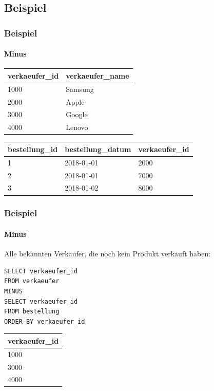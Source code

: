 \documentclass[10pt,a4paper]{beamer}
\begin{document}
\subsection{Beispiel}
\begin{frame}[fragile]
\frametitle{Beispiel}
\framesubtitle{Minus}
\begin{tabular}{l|l}
\textbf{verkaeufer\_id} & \textbf{verkaeufer\_name} \\ \hline
1000           & Samsung          \\
2000           & Apple            \\
3000           & Google           \\
4000           & Lenovo           \\
\end{tabular} 
\newline
\vspace*{1 cm}
\newline
\begin{tabular}{l|l|l}
\textbf{bestellung\_id} & \textbf{bestellung\_datum} & \textbf{verkaeufer\_id} \\ \hline
1              & 2018-01-01        & 2000           \\
2              & 2018-01-01        & 7000           \\
3              & 2018-01-02        & 8000           \\
\end{tabular}
\end{frame}

\begin{frame}[fragile]
\frametitle{Beispiel}
\framesubtitle{Minus}
Alle bekannten Verkäufer, die noch kein Produkt verkauft haben: \\
\begin{lstlisting}
SELECT verkaeufer_id
FROM verkaeufer
MINUS
SELECT verkaeufer_id
FROM bestellung
ORDER BY verkaeufer_id
\end{lstlisting}
\pause
\begin{tabular}{l}
\textbf{verkaeufer\_id} \\ \hline
1000 \\
3000 \\
4000 \\
\end{tabular}
\end{frame}
\end{document}
